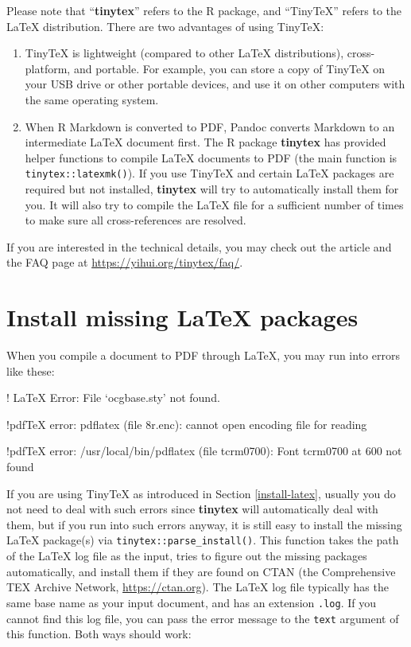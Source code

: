 \documentclass[
  11pt,
]{krantz}
\newenvironment{Shaded}{\begin{snugshade}}{\end{snugshade}}
\newcommand{\NormalTok}[1]{#1}
\begin{document}
Please note that ``\textbf{tinytex}'' refers to the R package, and ``TinyTeX'' refers to the LaTeX distribution. There are two advantages of using TinyTeX:

\begin{enumerate}
\def\labelenumi{\arabic{enumi}.}
\item
  TinyTeX is lightweight (compared to other LaTeX distributions), cross-platform, and portable. For example, you can store a copy of TinyTeX on your USB drive or other portable devices, and use it on other computers with the same operating system.
\item
  When R Markdown is converted to PDF, Pandoc converts Markdown to an intermediate LaTeX document first. The R package \textbf{tinytex} has provided helper functions to compile LaTeX documents to PDF (the main function is \texttt{tinytex::latexmk()}). If you use TinyTeX and certain LaTeX packages are required but not installed, \textbf{tinytex} will try to automatically install them for you. It will also try to compile the LaTeX file for a sufficient number of times to make sure all cross-references are resolved.
\end{enumerate}

If you are interested in the technical details, you may check out the article \citet{tinytex2019} and the FAQ page at \url{https://yihui.org/tinytex/faq/}.

\hypertarget{install-latex-pkgs}{%
\section{Install missing LaTeX packages}\label{install-latex-pkgs}}

When you compile a document to PDF through LaTeX, you may run into errors like these:

\begin{Shaded}
\begin{Highlighting}[]
\NormalTok{! LaTeX Error: File `ocgbase.sty' not found.}

\NormalTok{!pdfTeX error: pdflatex (file 8r.enc):}
\NormalTok{  cannot open encoding file for reading}

\NormalTok{!pdfTeX error: /usr/local/bin/pdflatex (file tcrm0700):}
\NormalTok{  Font tcrm0700 at 600 not found}
\end{Highlighting}
\end{Shaded}

If you are using TinyTeX as introduced in Section \ref{install-latex}, usually you do not need to deal with such errors since \textbf{tinytex} will automatically deal with them, but if you run into such errors anyway, it is still easy to install the missing LaTeX package(s) via \texttt{tinytex::parse\_install()}. This function takes the path of the LaTeX log file as the input, tries to figure out the missing packages automatically, and install them if they are found on CTAN (the Comprehensive TEX Archive Network, \url{https://ctan.org}). The LaTeX log file typically has the same base name as your input document, and has an extension \texttt{.log}. If you cannot find this log file, you can pass the error message to the \texttt{text} argument of this function. Both ways should work:
\end{document}
